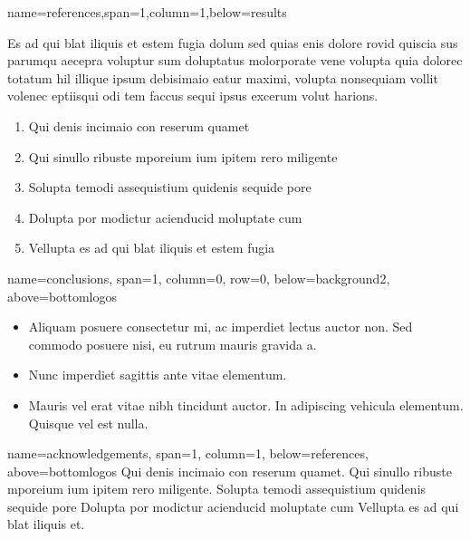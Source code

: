 \documentclass[a0paper,portrait]{baposter}
\newcommand{\acknowledgementsfont}{\small}
\begin{document}
\begin{poster}
{}

{name=references,span=1,column=1,below=results}{
Es ad qui blat iliquis et estem fugia dolum sed quias enis dolore rovid quiscia sus parumqu aecepra voluptur sum doluptatus molorporate vene volupta quia dolorec totatum hil illique ipsum debisimaio eatur maximi, volupta nonsequiam vollit volenec eptiisqui odi tem faccus sequi ipsus excerum volut harions.

\begin{enumerate}
\item Qui denis incimaio con reserum quamet
\item Qui sinullo ribuste mporeium ium ipitem rero miligente
\item Solupta temodi assequistium quidenis sequide pore
\item Dolupta por modictur acienducid moluptate cum
\item Vellupta es ad qui blat iliquis et estem fugia
\end{enumerate}
\vspace{1mm}
}






{name=conclusions, span=1, column=0, row=0, below=background2,
 above=bottomlogos
 }{
\vspace{0.5mm}

\begin{itemize}
\item Aliquam posuere consectetur mi, ac imperdiet lectus auctor non.
Sed commodo posuere nisi, eu rutrum mauris gravida a.
\item Nunc imperdiet sagittis ante vitae elementum.
\item Mauris vel erat vitae nibh tincidunt auctor. In adipiscing vehicula
elementum. Quisque vel est nulla.
\end{itemize}
}

{name=acknowledgements, span=1, column=1, below=references, 
above=bottomlogos
}{
\acknowledgementsfont
Qui denis incimaio con reserum quamet. Qui sinullo ribuste mporeium ium ipitem rero miligente. Solupta temodi assequistium quidenis sequide pore Dolupta por modictur acienducid moluptate cum Vellupta es ad qui blat iliquis et.
}




\end{poster}
\end{document}
